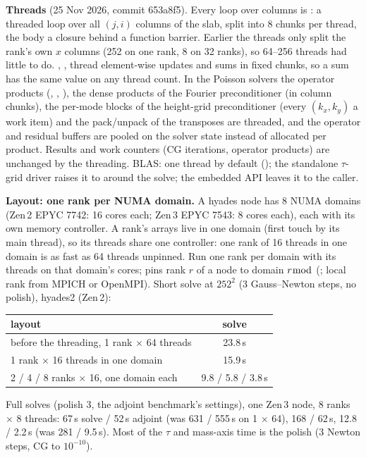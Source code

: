 \textbf{Threads} (25 Nov 2026, commit 653a8f5). Every loop over columns is : a threaded loop over all
$(j,i)$ columns of the slab, split into 8 chunks per thread, the body a closure behind a function barrier. Earlier the threads only
split the rank's own $x$ columns (252 on one rank, 8 on 32 ranks), so 64--256 threads had little to do. , ,
 thread element-wise updates and sums in fixed chunks, so a sum has the same value on any thread count. In the Poisson
solvers the operator products (, , ), the dense products of the Fourier preconditioner (in column
chunks), the per-mode blocks of the height-grid preconditioner (every $(k_x,k_y)$ a work item) and the pack/unpack of the
transposes are threaded, and the operator and residual buffers are pooled on the solver state instead of allocated per product.
Results and work counters (CG iterations, operator products) are unchanged by the threading. BLAS: one thread by default
(); the standalone $\tau$-grid driver raises it to  around the solve; the embedded API
leaves it to the caller.

\textbf{Layout: one rank per NUMA domain.} A hyades node has 8 NUMA domains (Zen\,2 EPYC 7742: 16 cores each; Zen\,3 EPYC 7543:
8 cores each), each with its own memory controller. A rank's arrays live in one domain (first touch by its main thread), so its
threads share one controller: one rank of 16 threads in one domain is as fast as 64 threads unpinned. Run one rank per domain
with its threads on that domain's cores;  pins rank $r$ of a node to domain
$r \bmod$  (; local rank from MPICH or OpenMPI). Short
 solve at $252^2$ (3 Gauss--Newton steps, no polish), hyades2 (Zen\,2):
\begin{center}\small
\begin{tabular}{lc}
\toprule
layout & solve \\ \midrule
before the threading, 1 rank $\times$ 64 threads & 23.8\,s \\
1 rank $\times$ 16 threads in one domain & 15.9\,s \\
2 / 4 / 8 ranks $\times$ 16, one domain each & 9.8 / 5.8 / 3.8\,s \\
\bottomrule
\end{tabular}
\end{center}
Full solves (polish 3, the adjoint benchmark's settings), one Zen\,3 node, 8 ranks $\times$ 8 threads: 
67\,s solve / 52\,s adjoint (was 631 / 555\,s on 1 $\times$ 64),  168 / 62\,s, 
12.8 / 2.2\,s (was 281 / 9.5\,s). Most of the $\tau$ and mass-axis time is the polish (3 Newton steps, CG to $10^{-10}$).

